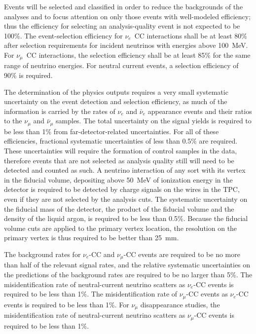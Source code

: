 Events will be selected and classified in order to reduce the
backgrounds of the analyses and to focus attention on only those
events with well-modeled efficiency; thus the efficiency for
selecting an analysis-quality event is not expected to be 100\%.  The
event-selection efficiency for $\nu_e$~CC interactions shall be at
least 80\% after selection requirements for incident neutrinos with
energies above 100~MeV.  For $\nu_\mu$~CC interactions, the selection
efficiency shall be at least 85\% for the same range of neutrino
energies.  For neutral current events, a selection efficiency of 90\%
is required.

The determination of the physics outputs requires a very small
systematic uncertainty on the event detection and selection
efficiency, as much of the information is carried by the rates of
$\nu_e$ and $\bar\nu_e$ appearance events and their ratios to the
$\nu_\mu$ and $\bar\nu_\mu$ samples.  The total uncertainty on the
signal yields is required to be less than 1\% from
far-detector-related uncertainties.  For all of these efficiencies, 
fractional systematic uncertainties of less than 0.5\% are required.  These
uncertainties will require the formation of control samples in the
data, therefore events that are not selected as analysis quality still will
need to be detected and counted as such.  %
A neutrino
interaction of any sort with its vertex in the fiducial volume,
depositing above 50~MeV of ionization energy in the detector is required to be
detected by charge signals on the wires in the TPC, even if they are
not selected by the analysis cuts.  %
The systematic
uncertainty on the fiducial mass of the detector, the product of the
fiducial volume and the density of the liquid argon, %
is required to be less than
0.5\%.  Because the fiducial volume cuts are applied to the primary
vertex location, the resolution on the primary vertex is thus required
to be better than 25~mm.

The background rates for $\nu_e$-CC and $\nu_\mu$-CC events are required
to be no more than half of the relevant signal rates, and the relative
systematic uncertainties on the predictions of the background rates 
are required to be no larger than 5\%.  The misidentification
rate of neutral-current neutrino scatters as $\nu_e$-CC events is
required to be less than 1\%.  The misidentification rate of
$\nu_\mu$-CC events as $\nu_e$-CC events is required to be less than
1\%.  For $\nu_\mu$ disappearance studies, the misidentification rate
of neutral-current neutrino scatters as $\nu_\mu$-CC events is
required to be less than 1\%.

